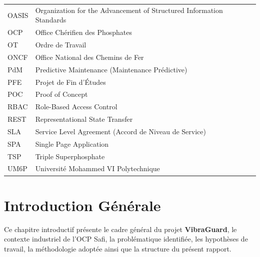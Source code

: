 \documentclass[12pt, a4paper, oneside]{report}
\newcommand{\projectname}{\textbf{VibraGuard}}
\begin{document}
\begin{center}
\begin{tabularx}{\textwidth}{L{3cm} X}
  OASIS     & Organization for the Advancement of Structured Information Standards \\
         OCP       & Office Chérifien des Phosphates \\
  OT        & Ordre de Travail \\
         ONCF      & Office National des Chemins de Fer \\
  PdM       & Predictive Maintenance (Maintenance Prédictive) \\
         PFE       & Projet de Fin d'Études \\
  POC       & Proof of Concept \\
         RBAC      & Role-Based Access Control \\
  REST      & Representational State Transfer \\
         SLA       & Service Level Agreement (Accord de Niveau de Service) \\
  SPA       & Single Page Application \\
  TSP       & Triple Superphosphate \\
         UM6P      & Université Mohammed VI Polytechnique \\
\bottomrule
\end{tabularx}
\end{center}

\newpage

\setcounter{page}{1}

\chapter*{Introduction Générale}

\setcounter{table}{0}

Ce chapitre introductif présente le cadre général du projet \projectname{}, le contexte industriel de l'OCP Safi, la problématique identifiée, les hypothèses de travail, la méthodologie adoptée ainsi que la structure du présent rapport.
\end{document}
